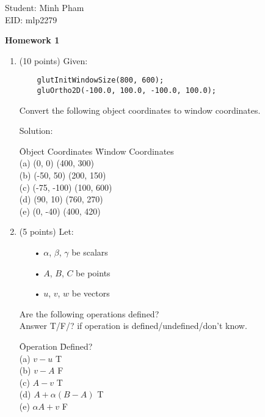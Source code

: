 \documentclass[13pt]{letter}
\begin{document}
Student: Minh Pham \\
EID: mlp2279

\begin{center}
	\textbf{Homework 1}
\end{center}

\begin{enumerate}
	\item (10 points)
	Given:
	\begin{verbatim}
	glutInitWindowSize(800, 600);
	gluOrtho2D(-100.0, 100.0, -100.0, 100.0);	
	\end{verbatim}
	
	Convert the following object coordinates to window coordinates.
	
	Solution:
	\begin{tabbing}
	\hspace{20pt} \= Object Coordinates \= Window Coordinates \\
	(a)           \> (0, 0)             \> (400, 300) \\
	(b)           \> (-50, 50)          \> (200, 150) \\
	(c)	          \> (-75, -100)        \> (100, 600) \\
	(d)	          \> (90, 10)           \> (760, 270) \\
	(e)	          \> (0, -40)           \> (400, 420) \\
	\end{tabbing}
	

	\item (5 points)
	Let:
	\begin{enumerate}
	\item[•] $\alpha$, $\beta$, $\gamma$ be scalars
	\item[•] $A$, $B$, $C$ be points
	\item[•] $u$, $v$, $w$ be vectors
	\end{enumerate}
	
	Are the following operations defined? \\
	Answer T/F/? if operation is defined/undefined/don't know.
	\begin{tabbing}
	\hspace{20pt} \= Operation \hspace{20pt} \= Defined?  \\
	(a)           \> $v - u$                 \> T \\
	(b)           \> $v - A$                 \> F \\
	(c)           \> $A - v$                 \> T \\
	(d)           \> $A + \alpha(B-A)$       \> T \\
	(e)           \> $\alpha A + v$          \> F \\
	\end{tabbing}
	

\end{enumerate}
\end{document}
